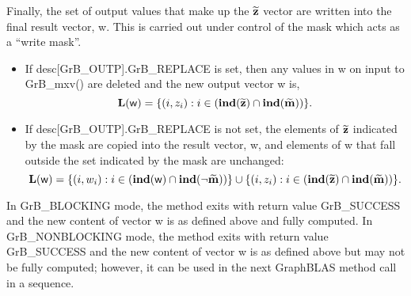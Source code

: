 Finally, the set of output values that make up the ${\bf \widetilde{z}}$ 
vector are written into the final result vector, {\sf w}. 
This is carried out under control of the mask which acts as a ``write mask''.
\begin{itemize}
\item If {\sf desc[GrB\_OUTP].GrB\_REPLACE} is set, then any values in {\sf w} 
on input to {\sf GrB\_mxv()} are deleted and the new output vector {\sf w} is,
\[ 
\bold{L}({\sf w}) = \{(i,z_{i}) : i \in (\bold{ind}({\bf \widetilde{z}}) 
\cap \bold{ind}({\bf \widetilde{m}})) \}. 
\]

\item If {\sf desc[GrB\_OUTP].GrB\_REPLACE} is not set, the elements of 
${\bf \widetilde{z}}$ indicated by the mask are copied into the result 
vector, {\sf w}, and elements of {\sf w} that fall outside the set indicated by 
the mask are unchanged:
\[ 
\bold{L}({\sf w}) = \{(i,w_{i}) : i \in (\bold{ind}({\bf \sf w}) 
\cap \bold{ind}(\neg {\bf \widetilde{m}})) \} \cup \{(i,z_{i}) : i \in 
(\bold{ind}({\bf \widetilde{z}}) \cap \bold{ind}({\bf \widetilde{m}})) \}. 
\]
\end{itemize}

In {\sf GrB\_BLOCKING} mode, the method exits with return value 
{\sf GrB\_SUCCESS} and the new content of vector {\sf w} is as defined above
and fully computed.  
In {\sf GrB\_NONBLOCKING} mode, the method exits with return value 
{\sf GrB\_SUCCESS} and the new content of vector {\sf w} is as defined above 
but may not be fully computed; however, it can be used in the next GraphBLAS 
method call in a sequence.

